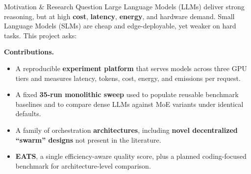 \begin{block}{Motivation \& Research Question}
  Large Language Models (LLMs) deliver strong reasoning, but at high \textbf{cost},
  \textbf{latency}, \textbf{energy}, and hardware demand. Small Language Models (SLMs)
  are cheap and edge-deployable, yet weaker on hard tasks. This project asks:

  \vspace{6pt}
  \begin{center}
  \end{center}

  \vspace{6pt}
  \textbf{Contributions.}
  \begin{itemize}
    \item A reproducible \textbf{experiment platform} that serves models across three GPU
          tiers and measures latency, tokens, cost, energy, and emissions per request.
    \item A fixed \textbf{35-run monolithic sweep} used to populate reusable benchmark
          baselines and to compare dense LLMs against MoE variants under identical defaults.
    \item A family of orchestration \textbf{architectures}, including \textbf{novel decentralized
          ``swarm'' designs} not present in the literature.
    \item \textbf{EATS}, a single efficiency-aware quality score, plus a planned
          coding-focused benchmark for architecture-level comparison.
  \end{itemize}
\end{block}
